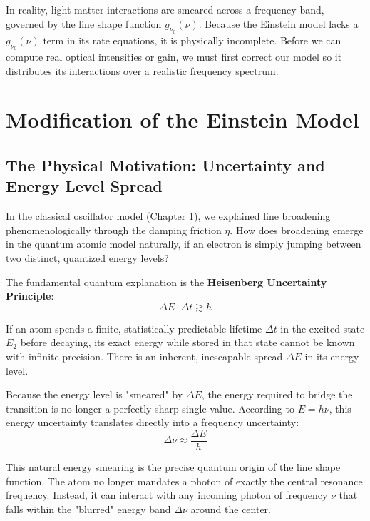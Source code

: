 In reality, light-matter interactions are smeared across a frequency band, governed by the line shape function $g_{\nu_0}(\nu)$. Because the Einstein model lacks a $g_{\nu_0}(\nu)$ term in its rate equations, it is physically incomplete. Before we can compute real optical intensities or gain, we must first correct our model so it distributes its interactions over a realistic frequency spectrum.

\section{Modification of the Einstein Model}

\subsection{The Physical Motivation: Uncertainty and Energy Level Spread}

In the classical oscillator model (Chapter 1), we explained line broadening phenomenologically through the damping friction $\eta$. How does broadening emerge in the quantum atomic model naturally, if an electron is simply jumping between two distinct, quantized energy levels?

The fundamental quantum explanation is the \textbf{Heisenberg Uncertainty Principle}:
\begin{equation*}
    \Delta E \cdot \Delta t \gtrsim \hbar
\end{equation*}

If an atom spends a finite, statistically predictable lifetime $\Delta t$ in the excited state $E_2$ before decaying, its exact energy while stored in that state cannot be known with infinite precision. There is an inherent, inescapable spread $\Delta E$ in its energy level.

Because the energy level is "smeared" by $\Delta E$, the energy required to bridge the transition is no longer a perfectly sharp single value. According to $E = h\nu$, this energy uncertainty translates directly into a frequency uncertainty:
\begin{equation*}
    \Delta\nu \approx \frac{\Delta E}{h}
\end{equation*}

This natural energy smearing is the precise quantum origin of the line shape function. The atom no longer mandates a photon of exactly the central resonance frequency. Instead, it can interact with any incoming photon of frequency $\nu$ that falls within the "blurred" energy band $\Delta\nu$ around the center.

